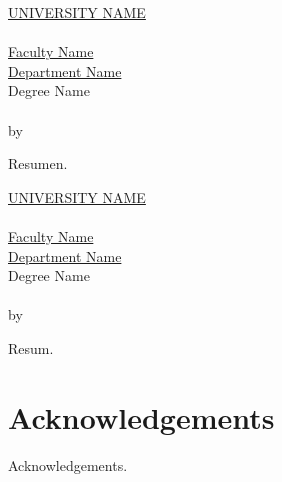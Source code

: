 \clearpage
\thispagestyle{plain}
\null\vfill
\begin{otherlanguage}{spanish}
  \begin{center}
    \makeatletter
    \MakeUppercase{\href{https://href.com}{University Name}} \\
    \vspace{20pt}
    {\huge \textit{\abstractname}} \\
    \bigskip
    \href{https://href.com}{Faculty Name} \\
    \href{https://href.com}{Department Name} \\
    \bigskip
    Degree Name \\
    \bigskip
    \textbf{\@title} \\
    \medskip
    by \@author \\
    \bigskip
    \makeatother
  \end{center}
  Resumen.
\end{otherlanguage}
\vfill\null


\clearpage
\thispagestyle{plain}
\null\vfill
\begin{otherlanguage}{catalan}
  \begin{center}
    \makeatletter
    \MakeUppercase{\href{https://href.com}{University Name}} \\
    \vspace{20pt}
    {\huge \textit{\abstractname}} \\
    \bigskip
    \href{https://href.com}{Faculty Name} \\
    \href{https://href.com}{Department Name} \\
    \bigskip
    Degree Name \\
    \bigskip
    \textbf{\@title} \\
    \medskip
    by \@author \\
    \bigskip
    \makeatother
  \end{center}
  Resum.
\end{otherlanguage}
\vfill\null


\chapter*{Acknowledgements}

Acknowledgements.


\tableofcontents
\listoffigures
\listoftables
{}